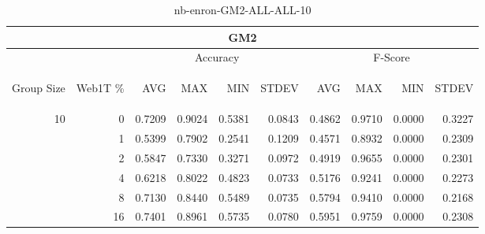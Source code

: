 \begin{center}
\begin{table}[htbp]
\begin{tabular}{ | r | r | r | r | r | r | r | r | r | r |}
\hline
\multicolumn{10}{|c|}{GM2}\\
\hline
 & & \multicolumn{4}{|c|}{Accuracy} & \multicolumn{4}{|c|}{F-Score}\\ \cline{3-10}
\begin{sideways}Group Size\end{sideways} & \begin{sideways}Web1T \%\end{sideways} & \begin{sideways}AVG\end{sideways} & \begin{sideways}MAX\end{sideways} & \begin{sideways}MIN\end{sideways} & \begin{sideways}STDEV\end{sideways} & \begin{sideways}AVG\end{sideways} & \begin{sideways}MAX\end{sideways} & \begin{sideways}MIN\end{sideways} & \begin{sideways}STDEV\end{sideways}\\
\hline
\multirow{6}{*}{10}
 & 0 & 0.7209 & 0.9024 & 0.5381 & 0.0843 & 0.4862 & 0.9710 & 0.0000 & 0.3227\\ \cline{2-10}
 & 1 & 0.5399 & 0.7902 & 0.2541 & 0.1209 & 0.4571 & 0.8932 & 0.0000 & 0.2309\\ \cline{2-10}
 & 2 & 0.5847 & 0.7330 & 0.3271 & 0.0972 & 0.4919 & 0.9655 & 0.0000 & 0.2301\\ \cline{2-10}
 & 4 & 0.6218 & 0.8022 & 0.4823 & 0.0733 & 0.5176 & 0.9241 & 0.0000 & 0.2273\\ \cline{2-10}
 & 8 & 0.7130 & 0.8440 & 0.5489 & 0.0735 & 0.5794 & 0.9410 & 0.0000 & 0.2168\\ \cline{2-10}
 & 16 & 0.7401 & 0.8961 & 0.5735 & 0.0780 & 0.5951 & 0.9759 & 0.0000 & 0.2308\\ \cline{2-10}
\hline
\end{tabular}
\caption{nb-enron-GM2-ALL-ALL-10}
\end{table}
\end{center}

